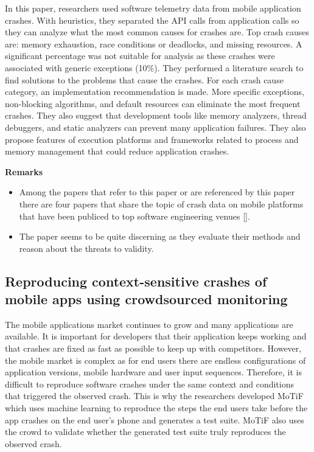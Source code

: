 \documentclass[]{book}
\providecommand{\tightlist}{%
  \setlength{\itemsep}{0pt}\setlength{\parskip}{0pt}}
\begin{document}
In this paper, researchers used software telemetry data from mobile
application crashes. With heuristics, they separated the API calls from
application calls so they can analyze what the most common causes for
crashes are. Top crash causes are: memory exhaustion, race conditions or
deadlocks, and missing resources. A significant percentage was not
suitable for analysis as these crashes were associated with generic
exceptions (10\%). They performed a literature search to find solutions
to the problems that cause the crashes. For each crash cause category,
an implementation recommendation is made. More specific exceptions,
non-blocking algorithms, and default resources can eliminate the most
frequent crashes. They also suggest that development tools like memory
analyzers, thread debuggers, and static analyzers can prevent many
application failures. They also propose features of execution platforms
and frameworks related to process and memory management that could
reduce application crashes.

\textbf{Remarks}

\begin{itemize}
\tightlist
\item
  Among the papers that refer to this paper or are referenced by this
  paper there are four papers that share the topic of crash data on
  mobile platforms that have been publiced to top software engineering
  venues {[}{]}.
\item
  The paper seems to be quite discerning as they evaluate their methods
  and reason about the threats to validity.
\end{itemize}

\subsection{Reproducing context-sensitive crashes of mobile apps using
crowdsourced
monitoring}\label{reproducing-context-sensitive-crashes-of-mobile-apps-using-crowdsourced-monitoring}

The mobile applications market continues to grow and many applications
are available. It is important for developers that their application
keeps working and that crashes are fixed as fast as possible to keep up
with competitors. However, the mobile market is complex as for end users
there are endless configurations of application versions, mobile
hardware and user input sequences. Therefore, it is difficult to
reproduce software crashes under the same context and conditions that
triggered the observed crash. This is why the researchers developed
MoTiF which uses machine learning to reproduce the steps the end users
take before the app crashes on the end user's phone and generates a test
suite. MoTiF also uses the crowd to validate whether the generated test
suite truly reproduces the observed crash.
\end{document}
